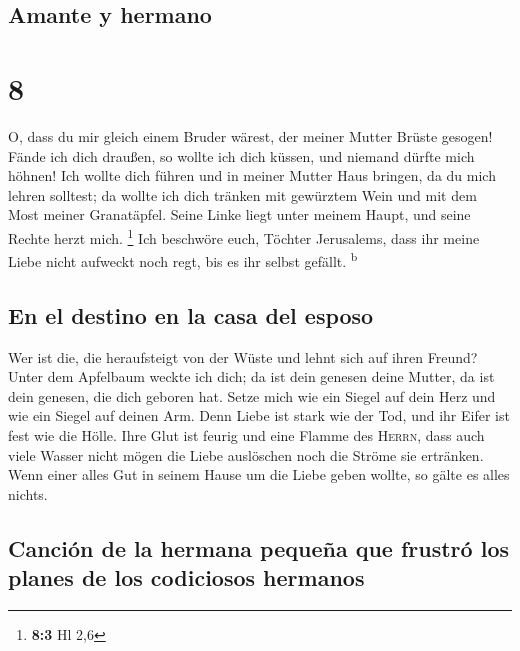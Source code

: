 \hypertarget{amante-y-hermano}{%
\subsection{Amante y hermano}\label{amante-y-hermano}}

\hypertarget{section-7}{%
\section{8}\label{section-7}}

 O, dass du mir gleich einem Bruder wärest, der meiner
Mutter Brüste gesogen! Fände ich dich draußen, so wollte ich dich
küssen, und niemand dürfte mich höhnen!  Ich wollte dich
führen und in meiner Mutter Haus bringen, da du mich lehren solltest; da
wollte ich dich tränken mit gewürztem Wein und mit dem Most meiner
Granatäpfel.  Seine Linke liegt unter meinem Haupt, und
seine Rechte herzt mich. \footnote{\textbf{8:3} Hl 2,6} 
Ich beschwöre euch, Töchter Jerusalems, dass ihr meine Liebe nicht
aufweckt noch regt, bis es ihr selbst gefällt. \textsuperscript{b}

\hypertarget{en-el-destino-en-la-casa-del-esposo}{%
\subsection{En el destino en la casa del
esposo}\label{en-el-destino-en-la-casa-del-esposo}}

 Wer ist die, die heraufsteigt von der Wüste und lehnt
sich auf ihren Freund? Unter dem Apfelbaum weckte ich dich; da ist dein
genesen deine Mutter, da ist dein genesen, die dich geboren hat.
 Setze mich wie ein Siegel auf dein Herz und wie ein
Siegel auf deinen Arm. Denn Liebe ist stark wie der Tod, und ihr Eifer
ist fest wie die Hölle. Ihre Glut ist feurig und eine Flamme des
\textsc{Herrn},  dass auch viele Wasser nicht mögen die
Liebe auslöschen noch die Ströme sie ertränken. Wenn einer alles Gut in
seinem Hause um die Liebe geben wollte, so gälte es alles nichts.

\hypertarget{canciuxf3n-de-la-hermana-pequeuxf1a-que-frustruxf3-los-planes-de-los-codiciosos-hermanos}{%
\subsection{Canción de la hermana pequeña que frustró los planes de los
codiciosos
hermanos}\label{canciuxf3n-de-la-hermana-pequeuxf1a-que-frustruxf3-los-planes-de-los-codiciosos-hermanos}}

